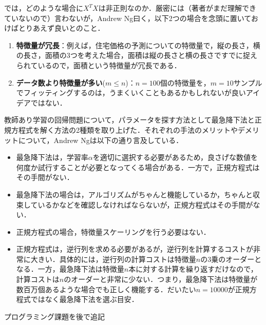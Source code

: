 では，どのような場合に$X^TX$は非正則なのか．厳密には（著者がまだ理解できていないので）言わないが，Andrew Ng曰く，以下2つの場合を念頭に置いておけばとりあえず良いとのこと．
\begin{enumerate}
\item {\bf 特徴量が冗長}：例えば，住宅価格の予測についての特徴量で，縦の長さ，横の長さ，面積の3つを考えた場合，面積は縦の長さと横の長さですでに捉えられているので，面積という特徴量が冗長である．
\item {\bf データ数より特徴量が多い}($m \leq n$)：$n=100$個の特徴量を，$m=10$サンプルでフィッティングするのは，うまくいくこともあるかもしれないが良いアイデアではない．
\end{enumerate}


教師あり学習の回帰問題について，パラメータを探す方法として最急降下法と正規方程式を解く方法の2種類を取り上げた．それぞれの手法のメリットやデメリットについて，Andrew Ngは以下の通り言及している．
\begin{itemize}
\item 最急降下法は，学習率$\alpha $を適切に選択する必要があるため，良さげな数値を何度か試行することが必要となってくる場合がある．一方で，正規方程式はその手間がない．
\item 最急降下法の場合は，アルゴリズムがちゃんと機能しているか，ちゃんと収束しているかなどを確認しなければならないが，正規方程式はその手間がない．
\item 正規方程式の場合，特徴量スケーリングを行う必要はない．
\item 正規方程式は，逆行列を求める必要があるが，逆行列を計算するコストが非常に大きい．具体的には，逆行列の計算コストは特徴量$n$の3乗のオーダーとなる．一方，最急降下法は特徴量$n$本に対する計算を繰り返すだけなので，計算コストは$n$のオーダーと非常に少ない．つまり，最急降下法は特徴量が数百万個あるような場合でも正しく機能する．だいたい$n=10000$が正規方程式ではなく最急降下法を選ぶ目安．
\end{itemize}

\begin{qu}
プログラミング課題を後で追記	
\end{qu}
